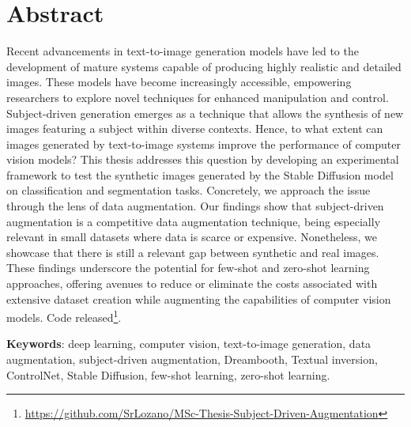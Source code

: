 \section*{Abstract}

Recent advancements in text-to-image generation models have led to the development of mature systems capable of producing highly realistic and detailed images. These models have become increasingly accessible, empowering researchers to explore novel techniques for enhanced manipulation and control. Subject-driven generation emerges as a technique that allows the synthesis of new images featuring a subject within diverse contexts. Hence, to what extent can images generated by text-to-image systems improve the performance of computer vision models? This thesis addresses this question by developing an experimental framework to test the synthetic images generated by the Stable Diffusion model on classification and segmentation tasks. Concretely, we approach the issue through the lens of data augmentation. Our findings show that subject-driven augmentation is a competitive data augmentation technique, being especially relevant in small datasets where data is scarce or expensive. Nonetheless, we showcase that there is still a relevant gap between synthetic and real images. These findings underscore the potential for few-shot and zero-shot learning approaches, offering avenues to reduce or eliminate the costs associated with extensive dataset creation while augmenting the capabilities of computer vision models. Code released\footnote{\href{https://github.com/SrLozano/MSc-Thesis-Subject-Driven-Augmentation}{https://github.com/SrLozano/MSc-Thesis-Subject-Driven-Augmentation}}.

\vspace{15pt}

\textbf{Keywords}: deep learning, computer vision, text-to-image generation, data augmentation, subject-driven augmentation, Dreambooth, Textual inversion, ControlNet, Stable Diffusion, few-shot learning, zero-shot learning.